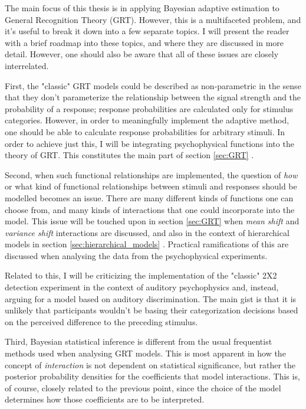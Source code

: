 \documentclass{article}\usepackage{knitr}
\begin{document}
The main focus of this thesis is in applying Bayesian adaptive estimation to General Recognition Theory (GRT). However, this is a multifaceted problem, and it's useful to break it down into a few separate topics. I will present the reader with a brief roadmap into these topics, and where they are discussed in more detail. However, one should also be aware that all of these issues are closely interrelated.

First, the "classic" GRT models could be described as non-parametric in the sense that they don't parameterize the relationship between the signal strength and the probability of a response; response probabilities are calculated only for stimulus categories. However, in order to meaningfully implement the adaptive method, one should be able to calculate response probabilities for arbitrary stimuli. In order to achieve just this, I will be integrating psychophysical functions into the theory of GRT. This constitutes the main part of section \ref{sec:GRT} \textit{}.  

Second, when such functional relationships are implemented, the question of \textit{how} or what kind of functional relationships between stimuli and responses should be modelled becomes an issue. There are many different kinds of functions one can choose from, and many kinds of interactions that one could incorporate into the model. This issue will be touched upon in section \ref{sec:GRT} when \textit{mean shift} and \textit{variance shift} interactions are discussed, and also in the context of hierarchical models in section \ref{sec:hierarchical_models} \textit{}. Practical ramifications of this are discussed when analysing the data from the psychophysical experiments. 

Related to this, I will be criticizing the implementation of the "classic" 2X2 detection experiment in the context of auditory psychophysics and, instead, arguing for a model based on auditory discrimination. The main gist is that it is unlikely that participants wouldn't be basing their categorization decisions based on the perceived difference to the preceding stimulus.

Third, Bayesian statistical inference is different from the usual frequentist methods used when analysing GRT models. This is most apparent in how the concept of \textit{interaction} is not dependent on statistical significance, but rather the posterior probability densities for the coefficients that model interactions. This is, of course, closely related to the previous point, since the choice of the model determines how those coefficients are to be interpreted. 
\end{document}
